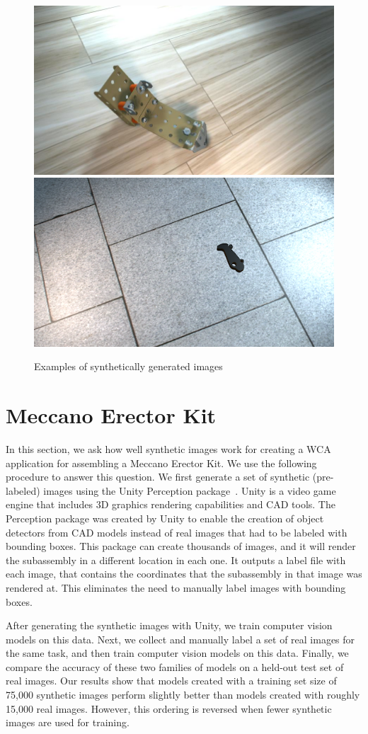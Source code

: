 \begin{figure}
  \includegraphics[width=0.5\columnwidth]{figures/synthetic/floor1.jpg}
  \includegraphics[width=0.5\columnwidth]{figures/synthetic/plane_train2.png}
  \caption{
    Examples of synthetically generated images
  }\label{fig:synthetic_examples}
\end{figure}

\vspace{-0.2in}

\section{Meccano Erector Kit}

\vspace{-0.1in}

In this section, we ask how well synthetic images work for creating a WCA
application for assembling a Meccano Erector Kit.
We use the following procedure to answer this
question.  We first generate a set of synthetic (pre-labeled) images
using the Unity Perception package~\cite{unity}.
Unity is a video game engine that includes 3D graphics rendering capabilities
and CAD tools.
The Perception package was created by Unity to enable the creation of object
detectors from CAD models instead of real images that had to be labeled with
bounding boxes.
This package can create thousands of images, and it will render the subassembly
in a different location in each one.
It outputs a label file with each image, that contains the coordinates that the
subassembly in that image was rendered at.
This eliminates the need to manually label images with bounding boxes.

After generating the synthetic images with Unity, we train
computer vision models on this data.  Next, we  collect and manually
label a set of real images for the same task, and then train computer
vision models on this data.  Finally, we compare the accuracy of these
two families of models on a held-out test set of real images.  Our
results show that models created with a training set size of 75,000
synthetic images perform slightly better than models created with
roughly 15,000 real images.
However, this ordering is reversed when fewer synthetic images are used for
training.

